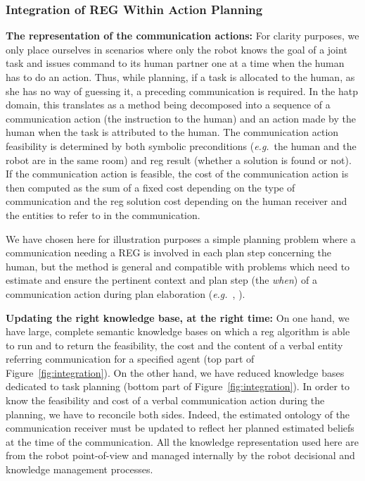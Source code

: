 \documentclass[a4paper,11pt,twoside]{StyleThese}
\begin{document}
\subsubsection{Integration of REG Within Action Planning}
\textbf{The representation of the communication actions:}
For clarity purposes, we only place ourselves in scenarios where only the robot knows the goal of a joint task and issues command to its human partner one at a time when the human has to do an action. Thus, while planning, if a task is allocated to the human, as she has no way of guessing it, a preceding communication is required. In the \acrshort{hatp} domain, this translates as a method being decomposed into a sequence of a communication action (the instruction to the human) and an action made by the human when the task is attributed to the human. The communication action feasibility is determined by both symbolic preconditions (\textit{e.g.}~the human and the robot are in the same room) and \acrshort{reg} result (whether a solution is found or not). If the communication action is feasible, the cost of the communication action is then computed as the sum of a fixed cost depending on the type of communication and the \acrshort{reg} solution cost depending on the human receiver and the entities to refer to in the communication.

We have chosen here for illustration purposes a simple planning problem where a communication needing a REG is involved in each plan step concerning the human, but the method is general and compatible with problems which need to estimate and ensure the pertinent context and plan step (the \textit{when}) of a communication action during plan elaboration (\textit{e.g.}~\cite{devin2016implemented}, \cite{unhelkar2020decision}).

\textbf{Updating the right knowledge base, at the right time:}
On one hand, we have large, complete semantic knowledge bases on which a \acrshort{reg} algorithm is able to run and to return the feasibility, the cost and the content of a verbal entity referring communication for a specified agent (top part of Figure~\ref{fig:integration}). On the other hand, we have reduced knowledge bases dedicated to task planning (bottom part of Figure~\ref{fig:integration}). In order to know the feasibility and cost of a verbal communication action during the planning, we have to reconcile both sides. Indeed, the estimated ontology of the communication receiver must be updated to reflect her planned estimated beliefs at the time of the communication. All the knowledge representation used here are from the robot point-of-view and managed internally by the robot decisional and knowledge management processes.
\end{document}
